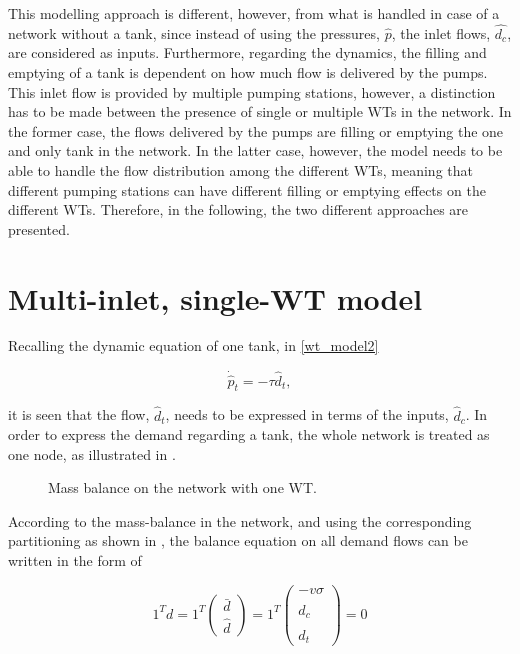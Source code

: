 This modelling approach is different, however,  from what is handled in case of a network without a tank, since instead of using the pressures, $\hat{p}$, the inlet flows, $\hat{d_c}$, are considered as inputs. Furthermore, regarding the dynamics, the filling and emptying of a tank is dependent on how much flow is delivered by the pumps. This inlet flow is provided by multiple pumping stations, however, a distinction has to be made between the presence of single or multiple WTs in the network. In the former case, the flows delivered by the pumps are filling or emptying the one and only tank in the network. In the latter case, however, the model needs to be able to handle the flow distribution among the different WTs, meaning that different pumping stations can have different filling or emptying effects on the different WTs. Therefore, in the following, the two different approaches are presented. 


\section{Multi-inlet, single-WT model}
\label{multi_inlet_single_WT_model}

Recalling the dynamic equation of one tank, in \eqref{wt_model2}

\begin{equation}
\label{wt_model_demand1}
\dot{\hat{p}}_{t} = -\tau \hat{d}_{t},
\end{equation}

it is seen that the flow, $\hat{d}_t$, needs to be expressed in terms of the inputs, $\hat{d}_c$. In order to express the demand regarding a tank, the whole network is treated as one node, as illustrated in . 

\begin{figure}[H]
\centering
 
\caption{Mass balance on the network with one WT.}
\label{fig:onenode_system}
\end{figure}

According to the mass-balance in the network, and using the corresponding partitioning as shown in , the balance equation on all demand flows can be written in the form of

\begin{equation}
\label{massbalance_model2}
1^Td 
 =
 1^T
\begin{pmatrix} 
\bar{d} \\
\hat{d}
\end{pmatrix}
=
1^T
\begin{pmatrix} 
-v \sigma \\
\hat{d}_c \\
\hat{d}_t 
\end{pmatrix}
=
0
\end{equation}

